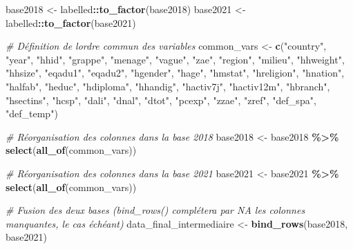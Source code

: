\documentclass[
]{article}
\newenvironment{Shaded}{\begin{snugshade}}{\end{snugshade}}
\newcommand{\CommentTok}[1]{\textcolor[rgb]{0.56,0.35,0.01}{\textit{#1}}}
\newcommand{\FunctionTok}[1]{\textcolor[rgb]{0.13,0.29,0.53}{\textbf{#1}}}
\newcommand{\NormalTok}[1]{#1}
\newcommand{\OtherTok}[1]{\textcolor[rgb]{0.56,0.35,0.01}{#1}}
\newcommand{\SpecialCharTok}[1]{\textcolor[rgb]{0.81,0.36,0.00}{\textbf{#1}}}
\newcommand{\StringTok}[1]{\textcolor[rgb]{0.31,0.60,0.02}{#1}}
\begin{document}
\begin{Shaded}
\begin{Highlighting}[]
\NormalTok{base2018 }\OtherTok{\textless{}{-}}\NormalTok{ labelled}\SpecialCharTok{::}\FunctionTok{to\_factor}\NormalTok{(base2018)}
\NormalTok{base2021 }\OtherTok{\textless{}{-}}\NormalTok{ labelled}\SpecialCharTok{::}\FunctionTok{to\_factor}\NormalTok{(base2021)}

\CommentTok{\# Définition de l\textquotesingle{}ordre commun des variables}
\NormalTok{common\_vars }\OtherTok{\textless{}{-}} \FunctionTok{c}\NormalTok{(}\StringTok{"country"}\NormalTok{, }\StringTok{"year"}\NormalTok{, }\StringTok{"hhid"}\NormalTok{, }\StringTok{"grappe"}\NormalTok{, }\StringTok{"menage"}\NormalTok{, }\StringTok{"vague"}\NormalTok{,}
                 \StringTok{"zae"}\NormalTok{, }\StringTok{"region"}\NormalTok{, }\StringTok{"milieu"}\NormalTok{, }\StringTok{"hhweight"}\NormalTok{, }\StringTok{"hhsize"}\NormalTok{,}
                 \StringTok{"eqadu1"}\NormalTok{, }\StringTok{"eqadu2"}\NormalTok{, }\StringTok{"hgender"}\NormalTok{, }\StringTok{"hage"}\NormalTok{, }\StringTok{"hmstat"}\NormalTok{,}
                 \StringTok{"hreligion"}\NormalTok{, }\StringTok{"hnation"}\NormalTok{, }\StringTok{"halfab"}\NormalTok{, }\StringTok{"heduc"}\NormalTok{, }\StringTok{"hdiploma"}\NormalTok{,}
                 \StringTok{"hhandig"}\NormalTok{, }\StringTok{"hactiv7j"}\NormalTok{, }\StringTok{"hactiv12m"}\NormalTok{, }\StringTok{"hbranch"}\NormalTok{,}
                 \StringTok{"hsectins"}\NormalTok{, }\StringTok{"hcsp"}\NormalTok{, }\StringTok{"dali"}\NormalTok{, }\StringTok{"dnal"}\NormalTok{, }\StringTok{"dtot"}\NormalTok{, }\StringTok{"pcexp"}\NormalTok{,}
                 \StringTok{"zzae"}\NormalTok{, }\StringTok{"zref"}\NormalTok{, }\StringTok{"def\_spa"}\NormalTok{, }\StringTok{"def\_temp"}\NormalTok{)}

\CommentTok{\# Réorganisation des colonnes dans la base 2018}
\NormalTok{base2018 }\OtherTok{\textless{}{-}}\NormalTok{ base2018 }\SpecialCharTok{\%\textgreater{}\%} 
  \FunctionTok{select}\NormalTok{(}\FunctionTok{all\_of}\NormalTok{(common\_vars))}

\CommentTok{\# Réorganisation des colonnes dans la base 2021}
\NormalTok{base2021 }\OtherTok{\textless{}{-}}\NormalTok{ base2021 }\SpecialCharTok{\%\textgreater{}\%} 
  \FunctionTok{select}\NormalTok{(}\FunctionTok{all\_of}\NormalTok{(common\_vars))}

\CommentTok{\# Fusion des deux bases (bind\_rows() complétera par NA les colonnes manquantes, le cas échéant)}
\NormalTok{data\_final\_intermediaire }\OtherTok{\textless{}{-}} \FunctionTok{bind\_rows}\NormalTok{(base2018, base2021)}


\end{Highlighting}
\end{Shaded}
\end{document}
